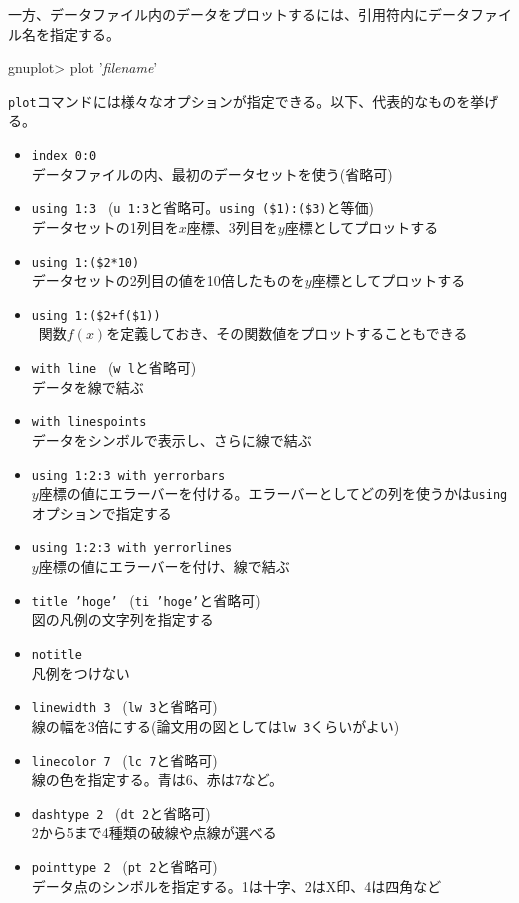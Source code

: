 一方、データファイル内のデータをプロットするには、引用符内にデータファイル名を指定する。
\begin{commandline2}
gnuplot> plot '{\it filename}'
\end{commandline2} \noindent
{\tt plot}コマンドには様々なオプションが指定できる。以下、代表的なものを挙げる。
\begin{itemize}
\item {\tt index 0:0} \\
  データファイルの内、最初のデータセットを使う(省略可)
\item {\tt using 1:3} \ ({\tt u 1:3}と省略可。{\tt using (\$1):(\$3)}と等価) \\
  データセットの1列目を$x$座標、3列目を$y$座標としてプロットする
\item {\tt using 1:(\$2*10)} \\
  データセットの2列目の値を10倍したものを$y$座標としてプロットする  
\item {\tt using 1:(\$2+f(\$1))} \\\
  関数$f(x)$を定義しておき、その関数値をプロットすることもできる
\item {\tt with line} \ ({\tt w l}と省略可) \\
  データを線で結ぶ
\item {\tt with linespoints} \\
  データをシンボルで表示し、さらに線で結ぶ
\item {\tt using 1:2:3 with yerrorbars} \\
  $y$座標の値にエラーバーを付ける。エラーバーとしてどの列を使うかは{\tt using}オプションで指定する
\item {\tt using 1:2:3 with yerrorlines} \\
  $y$座標の値にエラーバーを付け、線で結ぶ
\item {\tt title 'hoge'} \ ({\tt ti 'hoge'}と省略可) \\
  図の凡例の文字列を指定する
\item {\tt notitle} \\
  凡例をつけない
\item {\tt linewidth 3} \ ({\tt lw 3}と省略可) \\
  線の幅を3倍にする(論文用の図としては{\tt lw 3}くらいがよい)
\item {\tt linecolor 7} \ ({\tt lc 7}と省略可) \\
  線の色を指定する。青は6、赤は7など。
\item {\tt dashtype 2} \ ({\tt dt 2}と省略可) \\
  2から5まで4種類の破線や点線が選べる
\item {\tt pointtype 2} \ ({\tt pt 2}と省略可) \\
  データ点のシンボルを指定する。1は十字、2はX印、4は四角など
\end{itemize}
